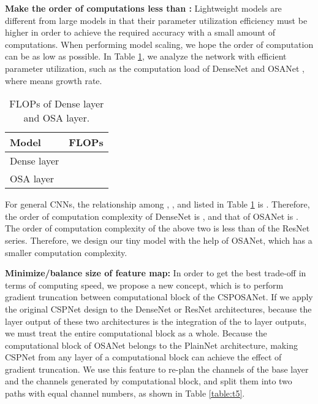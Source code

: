 \documentclass[10pt,twocolumn,letterpaper]{article}
\begin{document}
\noindent
\textbf{Make the order of computations less than :} Lightweight models are different from large models in that their parameter utilization efficiency must be higher in order to achieve the required accuracy with a small amount of computations.  When performing model scaling, we hope the order of computation can be as low as possible.  In Table \ref{table:t4}, we analyze the network with efficient parameter utilization, such as the computation load of DenseNet and OSANet \cite{lee2019energy}, where  means growth rate.

\begin{table}[h]
	\centering
	\begin{threeparttable}[h]
		\footnotesize
		\caption{FLOPs of Dense layer and OSA layer.}
		\label{table:t4}
		\setlength\tabcolsep{3.5pt}
		\begin{tabular}{lc}
			\toprule
			\textbf{Model} & \textbf{FLOPs} \\				
			\midrule
			Dense layer &  \\
			OSA layer &  \\
			\bottomrule
		\end{tabular}
	\end{threeparttable}
\end{table}

For general CNNs, the relationship among , , and  listed in Table \ref{table:t4} is .  Therefore, the order of computation complexity of DenseNet is , and that of OSANet is .  The order of computation complexity of the above two is less than  of the ResNet series.  Therefore, we design our tiny model with the help of OSANet, which has a smaller computation complexity.

\noindent
\textbf{Minimize/balance size of feature map:} 
In order to get the best trade-off in terms of computing speed, we propose a new concept, which is to perform gradient truncation between computational block of the CSPOSANet.  If we apply the original CSPNet design to the DenseNet or ResNet architectures, because the  layer output of these two architectures is the integration of the  to  layer outputs, we must treat the entire computational block as a whole.  Because the computational block of OSANet belongs to the PlainNet architecture, making CSPNet from any layer of a computational block can achieve the effect of gradient truncation.  We use this feature to re-plan the  channels of the base layer and the  channels generated by computational block, and split them into two paths with equal channel numbers, as shown in Table \ref{table:t5}.
\end{document}
